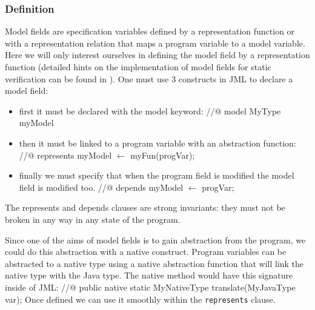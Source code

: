 \subsubsection{Definition}
Model fields are specification variables defined by a representation function or with a 
representation relation that maps a program variable to a model variable. Here we will 
only interest ourselves in defining the model field by a representation function (detailed
hints on the implementation of model fields for static verification can be found in
 \cite{LeinoMueller06,breunesse03verifying}). One must 
use 3 constructs in JML to declare a model field:
\begin{itemize}
\item first it must be declared with the model keyword: 
\btab 
//@ model MyType myModel
\etab
\item then it must be linked to a program variable with an abstraction function:
\btab
//@ represents myModel $\leftarrow$ myFun(progVar);
\etab
\item finally we must specify that when the program field is modified the model field is modified too.
\btab
//@ depends myModel $\leftarrow$ progVar;
\etab
\end{itemize}
The represents and depends clauses are strong invariants: they must not be broken 
in any way in any state of the program.

Since one of the aims of model fields is to gain abstraction from the program, 
we could do this abstraction with a native construct. Program variables can be 
abstracted to a native type using a native abstraction function that will link
 the native type with the Java type. The native method would have this signature inside of JML:
\btab
//@ public native static MyNativeType translate(MyJavaType var);
\etab
Once defined we can use it smoothly within the {\tt represents} clause.
